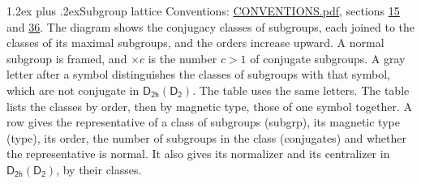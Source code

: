 \documentclass[10pt,a4paper]{article}
\makeatletter
\renewcommand\section{\@startsection{section}{1}{\z@}{-3ex plus -1ex minus -.2ex}%
  {1.2ex plus .2ex}{\normalfont\large\sffamily\bfseries\color{parttitle}}}
\numberwithin{equation}{section}
\newcommand{\grp}[1]{\mathsf{#1}}
\makeatother
\begin{document}
\section{Subgroup lattice}\label{s:subgroups}
Conventions: \href{../../CONVENTIONS.pdf}{CONVENTIONS.pdf}, sections \href{../../../rotation/CONVENTIONS.pdf\#conv.15}{15} and \href{../../CONVENTIONS.pdf\#conv.36}{36}.
The diagram shows the conjugacy classes of subgroups, each joined to the classes of its maximal subgroups, and the orders increase upward. \label{n:index.conjugates.c}A normal subgroup is framed, and ${\times}c$ is the number $c > 1$ of conjugate subgroups. \label{n:mark.letter}A gray letter after a symbol distinguishes the classes of subgroups with that symbol, which are not conjugate in $\grp{D_{2h}}(\grp{D_{2}})$. The table uses the same letters. The table lists the classes by order, then by magnetic type, those of one symbol together. \label{n:head.subgroup}\label{n:head.magnetic.type}\label{n:head.order}\label{n:head.conjugates}\label{n:head.normal}A row gives the representative of a class of subgroups (subgrp), its magnetic type (type), its order, the number of subgroups in the class (conjugates) and whether the representative is normal. \label{n:head.normalizer}\label{n:head.centralizer}It also gives its normalizer and its centralizer in $\grp{D_{2h}}(\grp{D_{2}})$, by their classes. 
\end{document}
